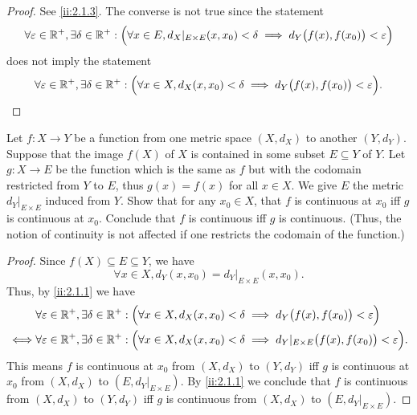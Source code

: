 \begin{proof}
  See \cref{ii:2.1.3}.
  The converse is not true since the statement
  \[
    \forall \varepsilon \in \mathbb{R}^+, \exists \delta \in \mathbb{R}^+ : \Big(\forall x \in E, d_X|_{E \times E}(x, x_0) < \delta \implies d_Y\big(f(x), f(x_0)\big) < \varepsilon\Big)
  \]
  does not imply the statement
  \[
    \forall \varepsilon \in \mathbb{R}^+, \exists \delta \in \mathbb{R}^+ : \Big(\forall x \in X, d_X(x, x_0) < \delta \implies d_Y\big(f(x), f(x_0)\big) < \varepsilon\Big).
  \]
\end{proof}

\begin{ex}\label{ii:ex:2.1.7}
  Let \(f : X \to Y\) be a function from one metric space \((X, d_X)\) to another \((Y, d_Y)\).
  Suppose that the image \(f(X)\) of \(X\) is contained in some subset \(E \subseteq Y\) of \(Y\).
  Let \(g : X \to E\) be the function which is the same as \(f\) but with the codomain restricted from \(Y\) to \(E\), thus \(g(x) = f(x)\) for all \(x \in X\).
  We give \(E\) the metric \(d_Y|_{E \times E}\) induced from \(Y\).
  Show that for any \(x_0 \in X\), that \(f\) is continuous at \(x_0\) iff \(g\) is continuous at \(x_0\).
  Conclude that \(f\) is continuous iff \(g\) is continuous.
  (Thus, the notion of continuity is not affected if one restricts the codomain of the function.)
\end{ex}

\begin{proof}
  Since \(f(X) \subseteq E \subseteq Y\), we have
  \[
    \forall x \in X, d_Y(x, x_0) = d_Y|_{E \times E}(x, x_0).
  \]
  Thus, by \cref{ii:2.1.1} we have
  \begin{align*}
         & \forall \varepsilon \in \mathbb{R}^+, \exists \delta \in \mathbb{R}^+ : \Big(\forall x \in X, d_X(x, x_0) < \delta \implies d_Y\big(f(x), f(x_0)\big) < \varepsilon\Big)                \\
    \iff & \forall \varepsilon \in \mathbb{R}^+, \exists \delta \in \mathbb{R}^+ : \Big(\forall x \in X, d_X(x, x_0) < \delta \implies d_Y|_{E \times E}\big(f(x), f(x_0)\big) < \varepsilon\Big).
  \end{align*}
  This means \(f\) is continuous at \(x_0\) from \((X, d_X)\) to \((Y, d_Y)\) iff \(g\) is continuous at \(x_0\) from \((X, d_X)\) to \((E, d_Y|_{E \times E})\).
  By \cref{ii:2.1.1} we conclude that \(f\) is continuous from \((X, d_X)\) to \((Y, d_Y)\) iff \(g\) is continuous from \((X, d_X)\) to \((E, d_Y|_{E \times E})\).
\end{proof}
